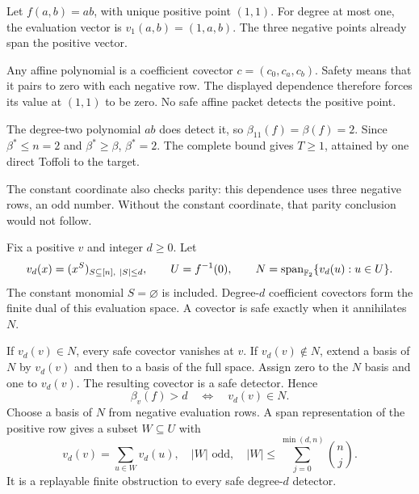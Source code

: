 
Let $f(a,b)=ab$, with unique positive point $(1,1)$. For degree at most one,
the evaluation vector is $v_1(a,b)=(1,a,b)$. The three negative points
already span the positive vector.


Any affine polynomial is a coefficient covector $c=(c_0,c_a,c_b)$.
Safety means that it pairs to zero with each negative row. The displayed
dependence therefore forces its value at $(1,1)$ to be zero. No safe affine
packet detects the positive point.

The degree-two polynomial $ab$ does detect it, so
$\beta_{11}(f)=\beta(f)=2$. Since $\beta^*\le n=2$ and $\beta^*\ge\beta$,
$\beta^*=2$. The complete bound gives $T\ge1$, attained by one direct
Toffoli to the target.

The constant coordinate also checks parity: this dependence uses three
negative rows, an odd number. Without the constant coordinate, that parity
conclusion would not follow.


Fix a positive $v$ and integer $d\ge0$. Let
\[
 v_d(x)=(x^S)_{S\subseteq[n],\ |S|\le d},\qquad
 U=f^{-1}(0),\qquad N=\operatorname{span}_{\mathbb F_2}\{v_d(u):u\in U\}.
\]
The constant monomial $S=\varnothing$ is included. Degree-$d$ coefficient
covectors form the finite dual of this evaluation space. A covector is safe
exactly when it annihilates $N$.

If $v_d(v)\in N$, every safe covector vanishes at $v$. If $v_d(v)\notin N$,
extend a basis of $N$ by $v_d(v)$ and then to a basis of the full space.
Assign zero to the $N$ basis and one to $v_d(v)$. The resulting covector is
a safe detector. Hence
\[
 \boxed{\beta_v(f)>d\quad\Longleftrightarrow\quad v_d(v)\in N.}
\]
Choose a basis of $N$ from negative evaluation rows. A span representation
of the positive row gives a subset $W\subseteq U$ with
\[
 v_d(v)=\sum_{u\in W}v_d(u),\quad |W|\text{ odd},\quad
 |W|\le\sum_{j=0}^{\min(d,n)}\binom nj.
\]
It is a replayable finite obstruction to every safe degree-$d$ detector.

